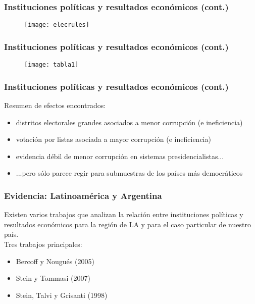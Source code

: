 \documentclass[handout,final,xcolor=dvipsnames]{beamer}
\begin{document}
\begin{frame}\frametitle{Instituciones políticas y resultados económicos (cont.)}
  \begin{figure}[htbp]
    \centering
    \texttt{[image: elecrules]}
  \end{figure}
\end{frame}


\begin{frame}\frametitle{Instituciones políticas y resultados económicos (cont.)}
\begin{figure}[htbp]
    \centering
    \texttt{[image: tabla1]}
  \end{figure}
\end{frame}


\begin{frame}\frametitle{Instituciones políticas y resultados económicos (cont.)}
Resumen de efectos encontrados:
\begin{itemize} \itemsep 10pt
\item distritos electorales grandes asociados a menor corrupción (e ineficiencia)
\item votación por listas asociada a mayor corrupción (e ineficiencia)
\item evidencia débil de menor corrupción en sistemas presidencialistas...
\item ...pero sólo parece regir para submuestras de los países más democráticos
\end{itemize}
\end{frame}


\begin{frame}\frametitle{Evidencia: Latinoamérica y Argentina}
Existen varios trabajos que analizan la relación entre instituciones políticas y resultados
económicos para la región de LA y para el caso particular de nuestro país. \\ \medskip 
Tres trabajos principales: \medskip 
\begin{itemize} \itemsep 10pt
\item Bercoff y Nougués (2005)
\item Stein y Tommasi (2007)
\item Stein, Talvi y Grisanti (1998)
\end{itemize}
\end{frame}
\end{document}

